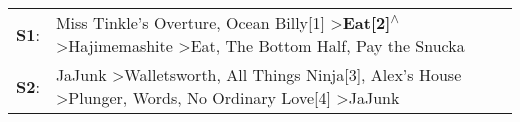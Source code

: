 \begin{supertabular}{p{0.03\textwidth}p{0.92\textwidth}}
 \textbf{S1}:  &             Miss Tinkle's Overture\textsuperscript{}, \enspace Ocean Billy[1]\textsuperscript{} \textgreater \enspace \textbf{Eat[2]\textsuperscript{$\wedge$}} \textgreater \enspace Hajimemashite\textsuperscript{} \textgreater \enspace Eat\textsuperscript{}, \enspace The Bottom Half\textsuperscript{}, \enspace Pay the Snucka\textsuperscript{}  \enspace  \\
 \textbf{S2}:  &  JaJunk\textsuperscript{} \textgreater \enspace Walletsworth\textsuperscript{}, \enspace All Things Ninja[3]\textsuperscript{}, \enspace Alex's House\textsuperscript{} \textgreater \enspace Plunger\textsuperscript{}, \enspace Words\textsuperscript{}, \enspace No Ordinary Love[4]\textsuperscript{} \textgreater \enspace JaJunk\textsuperscript{}  \enspace  \\
\end{supertabular}
